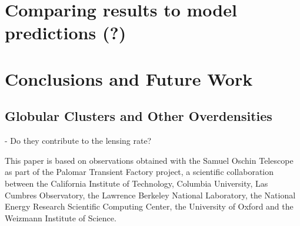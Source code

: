 \documentclass[12pt,preprint]{aastex}
\begin{document}
\section{Comparing results to model predictions (?)}

\section{Conclusions and Future Work}
\subsection{Globular Clusters and Other Overdensities}
- Do they contribute to the lensing rate?

\acknowledgments
This paper is based on observations obtained with the Samuel Oschin Telescope as part of the Palomar Transient Factory project, a scientific collaboration between the California Institute of Technology, Columbia University, Las Cumbres Observatory, the Lawrence Berkeley National Laboratory, the National Energy Research Scientific Computing Center, the University of Oxford and the Weizmann Institute of Science.

\clearpage
\setlength{\baselineskip}{0.6\baselineskip}

\setlength{\baselineskip}{1.667\baselineskip}


%
%
%
%
%
%
\end{document}
